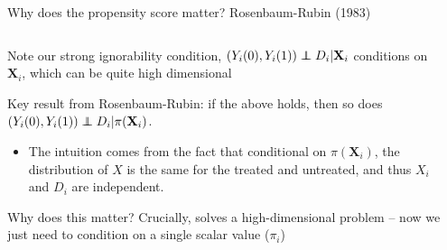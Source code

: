 \documentclass[notes,11pt, aspectratio=169]{beamer}
\newcommand\independent{\protect\mathpalette{\protect\independenT}{\perp}}
\def\independenT#1#2{\mathrel{\rlap{$#1#2$}\mkern2mu{#1#2}}}
\newenvironment{wideitemize}{\itemize\addtolength{\itemsep}{10pt}}{\enditemize}
\begin{document}
\begin{frame}{Why does the propensity score matter? Rosenbaum-Rubin (1983)}
\begin{columns}[T] %
\begin{column}{.75\textwidth}
  \begin{wideitemize}
  \item Note our strong ignorability condition,
    $(Y_{i}(0), Y_{i}(1)) \independent D_{i} | \mathbf{X}_{i}$
    conditions on $\mathbf{X}_{i}$, which can be quite high
    dimensional
  \item Key result from Rosenbaum-Rubin: if the above holds, then so does
    $(Y_{i}(0), Y_{i}(1)) \independent D_{i} | \pi(\mathbf{X}_{i})$.
    \begin{itemize}
    \item The intuition comes from the fact that conditional on $\pi(\mathbf{X}_{i})$, the distribution of $X$ is the same for the treated and untreated, and thus $X_{i}$ and $D_{i}$ are independent.
    \end{itemize}
  \item Why does this matter? Crucially, solves a high-dimensional
    problem -- now we just need to condition on a single scalar value
    ($\pi_{i}$)
    \end{wideitemize}
\end{column}%
\hfill%
\begin{column}{.4\textwidth}

\end{column}%
\end{columns}
\end{frame}
\end{document}
